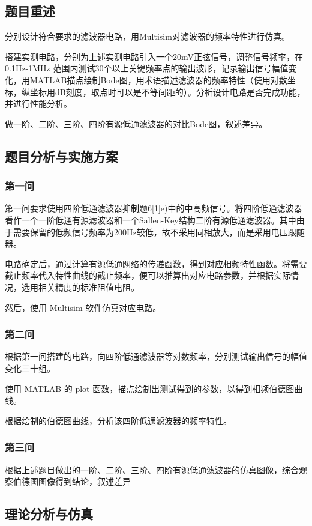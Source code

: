 \documentclass[./测控三级项目.tex]{subfiles} %
\begin{document}
	\subsection{题目重述}
		\begin{compactenum}
			\item 分别设计符合要求的滤波器电路，用Multisim对滤波器的频率特性进行仿真。
			\item 搭建实测电路，分别为上述实测电路引入一个20mV正弦信号，调整信号频率，在0.1Hz-1MHz 范围内测试30个以上关键频率点的输出波形，记录输出信号幅值变化，用MATLAB描点绘制Bode图，用术语描述滤波器的频率特性（使用对数坐标，纵坐标用dB刻度，取点时可以是不等间距的）。分析设计电路是否完成功能，并进行性能分析。
			\item 做一阶、二阶、三阶、四阶有源低通滤波器的对比Bode图，叙述差异。
		\end{compactenum}
	\subsection{题目分析与实施方案}
		\subsubsection{第一问}
			第一问要求使用四阶低通滤波器抑制题6[1]e)中的中高频信号。将四阶低通滤波器看作一个一阶低通有源滤波器和一个Sallen-Key结构二阶有源低通滤波器。其中由于需要保留的低频信号频率为200Hz较低，故不采用同相放大，而是采用电压跟随器。\par
			电路确定后，通过计算有源低通网络的传递函数，得到对应相频特性函数。将需要截止频率代入特性曲线的截止频率，便可以推算出对应电路参数，并根据实际情况，选用相关精度的标准阻值电阻。 \par
			然后，使用 Multisim 软件仿真对应电路。
		\subsubsection{第二问}
			根据第一问搭建的电路，向四阶低通滤波器等对数频率，分别测试输出信号的幅值变化三十组。\par 
			使用 MATLAB 的 plot 函数，描点绘制出测试得到的参数，以得到相频伯德图曲线。 \par
			根据绘制的伯德图曲线，分析该四阶低通滤波器的频率特性。
		\subsubsection{第三问}
			根据上述题目做出的一阶、二阶、三阶、四阶有源低通滤波器的仿真图像，综合观察伯德图图像得到结论，叙述差异
	\subsection{理论分析与仿真}
\end{document}

